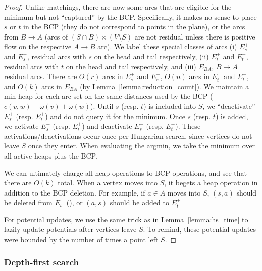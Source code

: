 \documentclass[11pt]{article}
\theoremstyle{plain}
\begin{document}
\begin{proof}
	Unlike matchings, there are now some arcs that are eligible for the 
	minimum but not ``captured'' by the BCP.
	Specifically, it makes no sense to place $s$ or $t$ in the BCP 
	(they do not correspond to points in the plane), or the arcs from 
	$B \to A$ (arcs of $(S \cap B) \times (V \setminus S)$ are not residual
	unless there is positive flow on the respective $A \to B$ arc).
	We label these special classes of arcs (i) $E_s^+$ and $E_s^-$, 
	residual arcs with $s$ on the head and tail respectively, (ii) 
	$E_t^+$ and $E_t^-$, residual arcs with $t$ on the head and tail 
	respectively, and (iii) $E_{BA}$, $B \to A$ residual arcs.
	There are $O(r)$ arcs in $E_s^+$ and $E_s^-$, $O(n)$ arcs in $E_t^+$ 
	and $E_t^-$, and $O(k)$ arcs in $E_{BA}$ 
	(by Lemma~\ref{lemma:reduction_count}).
	We maintain a min-heap for each arc set on the same distances used
	by the BCP ($c(v, w) - \omega(v) + \omega(w)$).
	Until $s$ (resp. $t$) is included into $S$, we ``deactivate'' $E_s^+$
	(resp. $E_t^+$) and do not query it for the minimum.
	Once $s$ (resp. $t$) is added, we activate $E_s^+$ (resp. $E_t^+$) and 
	deactivate $E_s^-$ (resp. $E_t^-$).
	These activations/deactivations occur once per Hungarian search, since
	vertices do not leave $S$ once they enter.
	When evaluating the argmin, we take the minimum over all active heaps
	plus the BCP.

	We can ultimately charge all heap operations to BCP operations, and
	see that there are $O(k)$ total.
	When a vertex moves into $S$, it begets a heap operation in addition 
	to the BCP deletion.
	For example, if $a \in A$ moves into $S$, $(s, a)$ should be deleted 
	from $E_t^-$ (), or $(a, s)$ should be added to $E_t^+$


	For potential updates, we use the same trick as in 
	Lemma~\ref{lemma:hs_time} to lazily update potentials after vertices
	leave $S$.
	To remind, these potential updates were bounded by the number of times
	a point left $S$.

\end{proof}


\subsubsection{Depth-first search}
\end{document}
